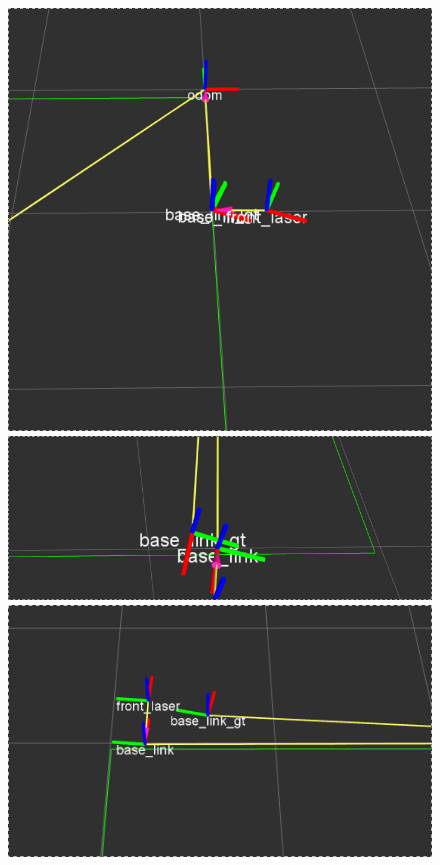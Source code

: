 \begin{figure}[!htb]
  \includegraphics[width=\linewidth]{imagenesExpLazoCerrado/k1/1.png}
\endminipage\hfill
{}
  \includegraphics[width=\linewidth]{imagenesExpLazoCerrado/k1/3.png}
\endminipage\hfill
{}%
  \includegraphics[width=\linewidth]{imagenesExpLazoCerrado/k1/5.png}
\endminipage
\end{figure}
\FloatBarrier

